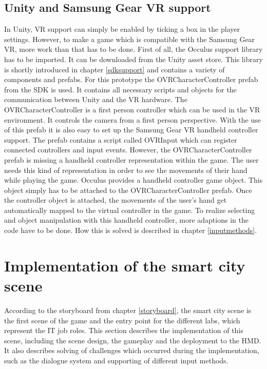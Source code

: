 \subsection{Unity and Samsung Gear VR support} \label{gearvrsupport}
In Unity, VR support can simply be enabled by ticking a box in the player settings. However, to make a game which is compatible with the Samsung Gear VR, more work than that has to be done. First of all, the Occulus support library has to be imported. It can be downloaded from the Unity asset store. This library is shortly introduced in chapter \ref{sdksupport} and contains a variety of components and prefabs. For this prototype the OVRCharacterController prefab from the SDK is used. It contains all necessary scripts and objects for the communication between Unity and the VR hardware. The OVRCharacterController is a first person controller which can be used in the VR environment. It controls the camera from a first person perspective. With the use of this prefab it is also easy to set up the Samsung Gear VR handheld controller support. The prefab contains a script called OVRInput which can register connected controllers and input events. However, the OVRCharacterController prefab is missing a handheld controller representation within the game. The user needs this kind of representation in order to see the movements of their hand while playing the game. Occulus provides a handheld controller game object. This object simply has to be attached to the OVRCharacterController prefab. Once the controller object is attached, the movements of the user's hand get automatically mapped to the virtual controller in the game. To realize selecting and object manipulation with this handheld controller, more adaptions in the code have to be done. How this is solved is described in chapter \ref{inputmethods}.

\section{Implementation of the smart city scene}
According to the storyboard from chapter \ref{storyboard}, the smart city scene is the first scene of the game and the entry point for the different labs, which represent the IT job roles. This section describes the implementation of this scene, including the scene design, the gameplay and the deployment to the HMD. It also describes   solving of challenges which occurred during the implementation, such as the dialogue system and supporting of different input methods.
